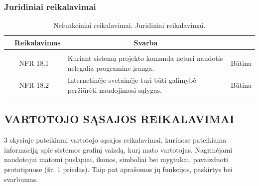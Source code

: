 \documentclass{VUMIFPSkursinis}
\begin{document}
\subsubsection{Juridiniai reikalavimai}
\begin{table}[H]
	\caption{Nefunkciniai reikalavimai. Juridiniai reikalavimai.}
	\begin{tabular}{|p{1cm}|p{1cm}|p{}|p{}|}
		\hline 
		\rowcolor{gray!50}
		\multicolumn{2}{|c|}{{\bfseries Kodas}}&
		\multicolumn{1}{c|}{{\bfseries Reikalavimas}}&
		\multicolumn{1}{c|}{{\bfseries Svarba}}\\
		\hline
		\rowcolor{lightgray}
		\multicolumn{4}{|c|}{Juridiniai reikalavimai}\\		
		
		\hline
		\multicolumn{2}{|c|}{NFR 18.1}&
		{Kuriant sistemą projekto komanda neturi naudotis nelegalia
			programine įranga.
		}&		
		\multicolumn{1}{c|}{Būtina}\\
		
		\hline
		\multicolumn{2}{|c|}{NFR 18.2}&
		{Internetinėje svetainėje turi būti galimybė peržiūrėti naudojimosi sąlygas.
		}&		
		\multicolumn{1}{c|}{Būtina}\\				
		\hline
	\end{tabular}		
\end{table}
\newpage

\subsection{VARTOTOJO SĄSAJOS REIKALAVIMAI}
3 skyriuje pateikiami vartotojo sąsajos reikalavimai, kuriuose pateikiama informaciją apie sistemos grafinį vaizdą, kurį mato vartotojas. Nagrinėjami naudotojui matomi puslapiai, ikonos, simboliai bei mygtukai, pavaizduoti prototipuose (žr. 1 priedas). Taip pat aprašomos jų funkcijos, paskirtys bei svarbumas.
\end{document}
